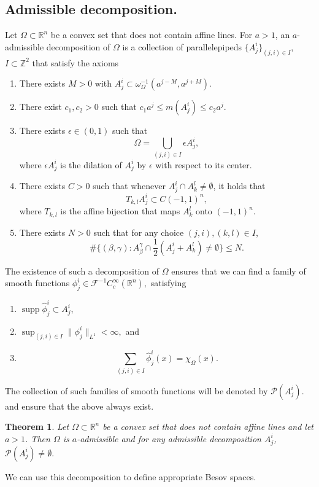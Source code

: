 \documentclass{amsart}
\theoremstyle{plain}
\newtheorem{theo}{Theorem}[section]
\DeclareMathOperator{\supp}{supp}
\begin{document}
\subsection*{Admissible decomposition.} Let $\Omega\subset\mathbb{R}^n$ be a convex set that does not contain affine lines. For $a>1$, an $a$-admissible decomposition of $\Omega$ is a collection of parallelepipeds $\{A_j^i\}_{(j,i)\in I}$, $I\subset \mathbb{Z}^2$ that satisfy the axioms
\begin{enumerate}
	\item There exists $M>0$ with $A_j^i\subset \omega_\Omega^{-1}(a^{j-M},a^{j+M}).$
	\item There exist $c_1,c_2>0$ such that $c_1a^j\leq m(A_j^i)\leq c_2 a^j.$
	\item There exists $\epsilon\in (0,1)$ such that
	$$\Omega= \bigcup_{(j,i)\in I}\epsilon A_j^i,$$ where $\epsilon A_j^i$ is the dilation of $A_j^i$ by $\epsilon$ with respect to its center.
	\item There exists $C>0$ such that whenever $A_j^i\cap A_k^l\neq \emptyset$, it holds that 
	$$T_{k,l}A_j^i\subset C(-1,1)^n,$$ where $T_{k,l}$ is the affine bijection that maps $A_k^l$ onto $(-1,1)^n$.
	\item There exists $N>0$ such that for any choice $(j,i),(k,l)\in I$, $$\#\{(\beta,\gamma):A_\beta^\gamma \cap \frac{1}{2}(A_j^i+A_k^l)\neq\emptyset\}\leq N.$$
\end{enumerate}

The existence of such a decomposition of $\Omega$ ensures that we can find a family of smooth functions $\phi_j^i\in \mathcal{F}^{-1}C_c^\infty(\mathbb{R}^n),$ satisfying 
\begin{enumerate}
	\item $\supp\widehat{\phi}_j^i\subset A_j^i$,
	\item $\sup_{(j,i)\in I}\|\phi_j^i\|_{L^1}<\infty,$ and
	\item $$\sum_{(j,i)\in I}\widehat{\phi}_j^i(x)=\chi_\Omega(x).$$
\end{enumerate}
The collection of such families of smooth functions will be denoted by $\mathscr{P}(A_j^i)$. \cite[Proposition 2.6]{bampouras2024besovspacesschattenclass} and \cite[Theorem 1.9]{bampouras2026boundaryweightedfourierinequalitiesconvex} ensure that the above always exist.
\begin{theo}
	Let $\Omega\subset\mathbb{R}^n$ be a convex set that does not contain affine lines and let $a>1$. Then $\Omega$ is $a$-admissible and for any admissible decomposition $A_j^i$, $\mathscr{P}(A_j^i)\neq \emptyset.$
\end{theo}
We can use this decomposition to define appropriate Besov spaces.
\end{document}
